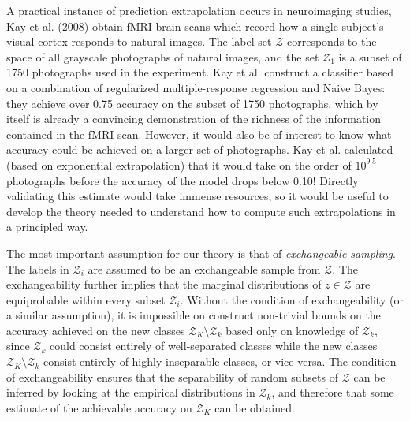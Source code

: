 \documentclass{article}
\begin{document}
A practical instance of prediction extrapolation occurs in neuroimaging studies,
Kay et al. (2008) obtain fMRI brain scans which record how a single subject's visual cortex responds to natural images.
The label set $\mathcal{Z}$ corresponds to the space of all grayscale photographs of natural images,
and the set $\mathcal{Z}_1$ is a subset of 1750 photographs used in the experiment.
Kay et al. construct a classifier based on a combination of regularized multiple-response regression
and Naive Bayes: they achieve over 0.75 accuracy on the subset of 1750 photographs,
which by itself is already a convincing demonstration of the richness of the information contained in the fMRI scan.
However, it would also be of interest to know what accuracy could be achieved on a larger set of photographs.
Kay et al. calculated (based on exponential extrapolation) that it would take on the order of $10^{9.5}$ photographs
before the accuracy of the model drops below 0.10!  Directly validating this estimate would take immense resources,
so it would be useful to develop the theory needed to understand how to compute such extrapolations
in a principled way. 

The most important assumption for our theory is that of \emph{exchangeable sampling}.
The labels in $\mathcal{Z}_i$ are assumed to be an exchangeable sample from $\mathcal{Z}$.
The exchangeability further implies that the marginal distributions of $z \in \mathcal{Z}$ 
are equiprobable within every subset $\mathcal{Z}_i$.  Without the condition of exchangeability (or a similar assumption),
it is impossible on construct
non-trivial bounds on the accuracy achieved on the new classes $\mathcal{Z}_K \setminus \mathcal{Z}_k$
based only on knowledge of $\mathcal{Z}_k$, since $\mathcal{Z}_k$ could consist entirely of well-separated classes
while the new classes $\mathcal{Z}_K \setminus \mathcal{Z}_k$ consist entirely of highly inseparable classes, or vice-versa.
The condition of exchangeability ensures that the separability of random subsets of $\mathcal{Z}$ can be inferred
by looking at the empirical distributions in $\mathcal{Z}_k$, and therefore that some estimate of the achievable
accuracy on $\mathcal{Z}_K$ can be obtained.
\end{document}
